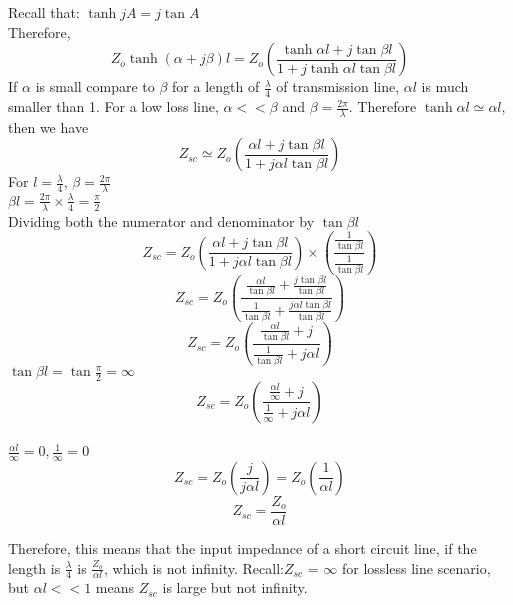 	Recall that: $ \tanh jA= j\tan A $\\
	Therefore,
	\begin{equation}
	Z_{o}\tanh(\alpha+j\beta)l=Z_{o}\left(\frac{\tanh \alpha l+j\tan \beta l}{1+j\tanh \alpha l\tan \beta l}\right)
	\end{equation}
	If $ \alpha $ is small compare to $ \beta $ for a length of $ \frac{\lambda}{4} $ of transmission line, $ \alpha l $ is much smaller than 1. For a low loss line, $ \alpha<<\beta $ and $ \beta=\frac{2\pi}{\lambda} $. Therefore	$ \tanh \alpha l \simeq \alpha l $, then we have
	\begin{equation}
	Z_{sc}\simeq Z_{o}\left(\frac{\alpha l + j \tan \beta l}{1+ j\alpha l \tan\beta l}\right)
	\end{equation} 
	For $ l=\frac{\lambda}{4} $, $ \beta=\frac{2\pi}{\lambda} $\\
	$ \beta l= \frac{2\pi}{\lambda} \times\frac{\lambda}{4} =\frac{\pi}{2} $\\
	Dividing both the numerator and denominator by $ \tan\beta l $
	\begin{equation}
	Z_{sc}=Z_{o}\left(\frac{\alpha l + j \tan \beta l}{1+ j\alpha l \tan\beta l}\right)\times\left(\frac{\frac{1}{\tan \beta l}}{\frac{1}{\tan \beta l}}\right)
	\end{equation}
	\begin{equation}
	Z_{sc}=Z_{o}\left(\frac{\frac{\alpha l}{\tan \beta l}+\frac{j\tan \beta l}{\tan \beta l}}{\frac{1}{\tan \beta l}+\frac{j\alpha l\tan \beta l}{\tan \beta l}}\right)
	\end{equation}
	\begin{equation}
	Z_{sc}=Z_{o}\left(\frac{\frac{\alpha l}{\tan \beta l} + j}{\frac{1}{\tan \beta l} + j\alpha l}\right)
	\end{equation}
	$ \tan \beta l =\tan\frac{\pi}{2}=\infty $
	\begin{equation}
	Z_{sc}=Z_{o}\left(\frac{\frac{\alpha l}{\infty} + j}{\frac{1}{\infty} + j \alpha l}\right)
	\end{equation}\\
	$ \frac{\alpha l}{\infty}=0, \frac{1}{\infty}=0  $
	\begin{equation}
	Z_{sc}=Z_{o}\left(\frac{j}{j\alpha l}\right)=Z_{o}\left(\frac{1}{\alpha l}\right)
	\end{equation}
	\begin{equation}
	\boxed{Z_{sc}=\frac{Z_{o}}{\alpha l}}	\end{equation}
	
	Therefore, this means that the input impedance of a short circuit line, if the length is $ \frac{\lambda}{4} $ is $ \frac{Z_{o}}{\alpha l} $, which is not infinity. Recall:$ Z_{sc} $ = $ \infty $ for lossless line scenario, but $ \alpha l << 1 $ means $ Z_{sc} $ is large but not infinity.\\
	
